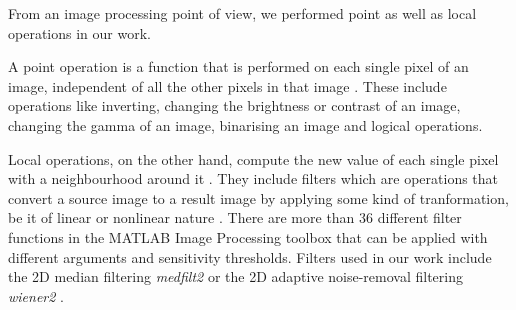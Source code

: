 
From an image processing point of view, we performed point as well as local operations in our work.

A point operation is a function that is performed on each single pixel of an image, independent of all the other pixels in that image \cite{maini2010comprehensive}. These include operations like inverting, changing the brightness or contrast of an image, changing the gamma of an image, binarising an image and logical operations. 

Local operations, on the other hand, compute the new value of each single pixel with a neighbourhood around it \cite{pointOperation2018}. %
They include filters which are operations that convert a source image to a result image by applying some kind of tranformation, be it of linear or nonlinear nature \cite{pointOperation2018}. There are more than 36 different filter functions in the MATLAB Image Processing toolbox \cite{matlab} that can be applied with different arguments and sensitivity thresholds. Filters used in our work include the 2D median filtering \textit{medfilt2} or the 2D adaptive noise-removal filtering \textit{wiener2} \cite{matlab}.




